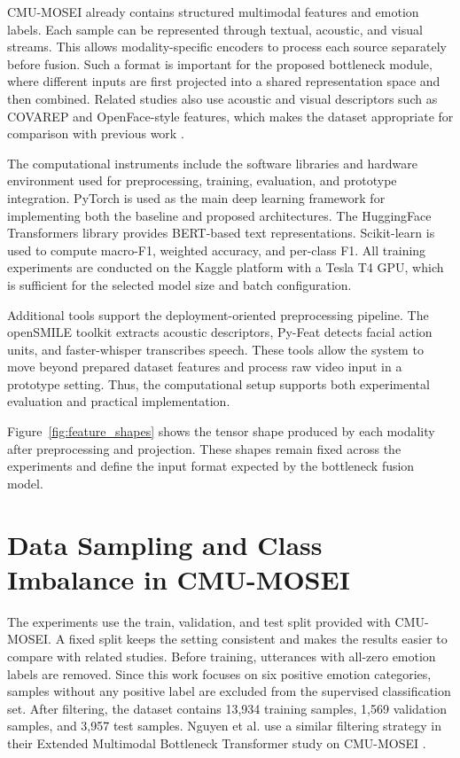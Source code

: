 CMU-MOSEI already contains structured multimodal features and emotion labels. Each sample can be represented through textual, acoustic, and visual streams. This allows modality-specific encoders to process each source separately before fusion. Such a format is important for the proposed bottleneck module, where different inputs are first projected into a shared representation space and then combined. Related studies also use acoustic and visual descriptors such as COVAREP and OpenFace-style features, which makes the dataset appropriate for comparison with previous work \cite{mora2021unimodal,sanjyal2026affectdiff}.

The computational instruments include the software libraries and hardware environment used for preprocessing, training, evaluation, and prototype integration. PyTorch is used as the main deep learning framework for implementing both the baseline and proposed architectures. The HuggingFace Transformers library provides BERT-based text representations. Scikit-learn is used to compute macro-F1, weighted accuracy, and per-class F1. All training experiments are conducted on the Kaggle platform with a Tesla T4 GPU, which is sufficient for the selected model size and batch configuration.

Additional tools support the deployment-oriented preprocessing pipeline. The openSMILE toolkit extracts acoustic descriptors, Py-Feat detects facial action units, and faster-whisper transcribes speech. These tools allow the system to move beyond prepared dataset features and process raw video input in a prototype setting. Thus, the computational setup supports both experimental evaluation and practical implementation.

Figure~\ref{fig:feature_shapes} shows the tensor shape produced by each modality after preprocessing and projection. These shapes remain fixed across the experiments and define the input format expected by the bottleneck fusion model.



\section{Data Sampling and Class Imbalance in CMU-MOSEI}
\label{sec:sampling}

The experiments use the train, validation, and test split provided with CMU-MOSEI. A fixed split keeps the setting consistent and makes the results easier to compare with related studies. Before training, utterances with all-zero emotion labels are removed. Since this work focuses on six positive emotion categories, samples without any positive label are excluded from the supervised classification set. After filtering, the dataset contains 13,934 training samples, 1,569 validation samples, and 3,957 test samples. Nguyen et al. use a similar filtering strategy in their Extended Multimodal Bottleneck Transformer study on CMU-MOSEI \cite{nguyen2025enhanced}.

